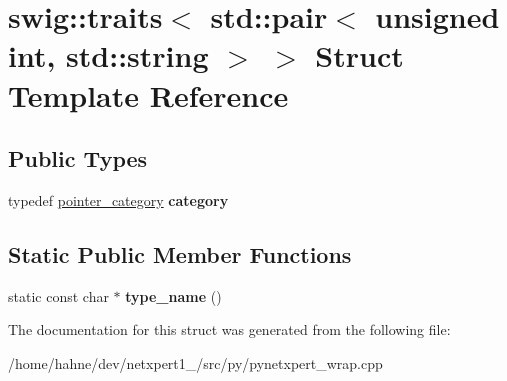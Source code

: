 \hypertarget{structswig_1_1traits_3_01std_1_1pair_3_01unsigned_01int_00_01std_1_1string_01_4_01_4}{}\section{swig\+:\+:traits$<$ std\+:\+:pair$<$ unsigned int, std\+:\+:string $>$ $>$ Struct Template Reference}
\label{structswig_1_1traits_3_01std_1_1pair_3_01unsigned_01int_00_01std_1_1string_01_4_01_4}
\subsection*{Public Types}
\begin{DoxyCompactItemize}
\item 
typedef \hyperlink{structswig_1_1pointer__category}{pointer\+\_\+category} {\bfseries category}\hypertarget{structswig_1_1traits_3_01std_1_1pair_3_01unsigned_01int_00_01std_1_1string_01_4_01_4_a2504d11f63a168d586cc384433b0d27b}{}\label{structswig_1_1traits_3_01std_1_1pair_3_01unsigned_01int_00_01std_1_1string_01_4_01_4_a2504d11f63a168d586cc384433b0d27b}

\end{DoxyCompactItemize}
\subsection*{Static Public Member Functions}
\begin{DoxyCompactItemize}
\item 
static const char $\ast$ {\bfseries type\+\_\+name} ()\hypertarget{structswig_1_1traits_3_01std_1_1pair_3_01unsigned_01int_00_01std_1_1string_01_4_01_4_a2645b251f11ab4412dfe0547bce19a3a}{}\label{structswig_1_1traits_3_01std_1_1pair_3_01unsigned_01int_00_01std_1_1string_01_4_01_4_a2645b251f11ab4412dfe0547bce19a3a}

\end{DoxyCompactItemize}


The documentation for this struct was generated from the following file\+:\begin{DoxyCompactItemize}
\item 
/home/hahne/dev/netxpert1\+\_/src/py/pynetxpert\+\_\+wrap.\+cpp\end{DoxyCompactItemize}
